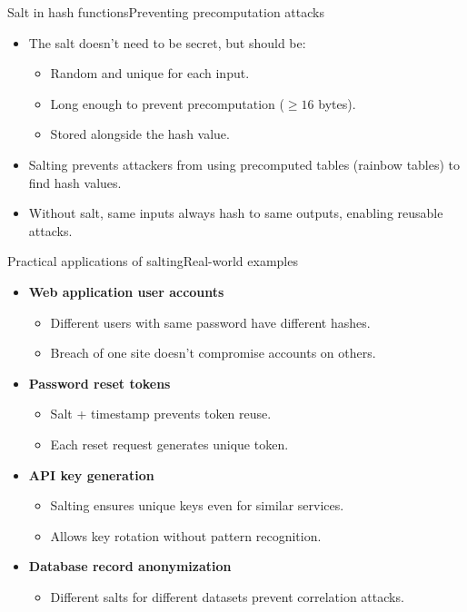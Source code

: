 \documentclass[aspectratio=169, lualatex, handout]{beamer}
\begin{document}
\begin{frame}{Salt in hash functions}{Preventing precomputation attacks}
	\begin{itemize}[<+->]
		\item The salt doesn't need to be secret, but should be:
		      \begin{itemize}
			      \item Random and unique for each input.
			      \item Long enough to prevent precomputation ($\geq 16$ bytes).
			      \item Stored alongside the hash value.
		      \end{itemize}
		\item Salting prevents attackers from using precomputed tables (rainbow tables) to find hash values.
		\item Without salt, same inputs always hash to same outputs, enabling reusable attacks.
	\end{itemize}
\end{frame}

\begin{frame}{Practical applications of salting}{Real-world examples}
	\begin{itemize}[<+->]
		\item \textbf{Web application user accounts}
		      \begin{itemize}
			      \item Different users with same password have different hashes.
			      \item Breach of one site doesn't compromise accounts on others.
		      \end{itemize}
		\item \textbf{Password reset tokens}
		      \begin{itemize}
			      \item Salt + timestamp prevents token reuse.
			      \item Each reset request generates unique token.
		      \end{itemize}
		\item \textbf{API key generation}
		      \begin{itemize}
			      \item Salting ensures unique keys even for similar services.
			      \item Allows key rotation without pattern recognition.
		      \end{itemize}
		\item \textbf{Database record anonymization}
		      \begin{itemize}
			      \item Different salts for different datasets prevent correlation attacks.
		      \end{itemize}
	\end{itemize}
\end{frame}
\end{document}
